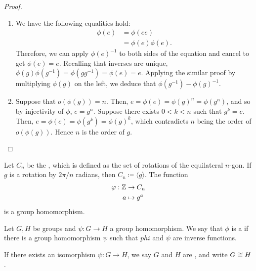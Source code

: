\begin{proof}
  \begin{enumerate}
  \item
    We have the following equalities hold:
    \begin{align*}
      \phi(e) &= \phi(ee) \\
              &= \phi(e) \phi(e).
    \end{align*}
    Therefore, we can apply \(\phi(e)^{-1}\) to both sides of the equation and cancel to get \(\phi(e) = e\).
    Recalling that inverses are unique, \(\phi(g)\phi(g^{-1}) = \phi(gg^{-1}) = \phi(e) = e\).
    Applying the similar proof by multiplying \(\phi(g)\) on the left, we deduce that \(\phi(g^{-1}) - \phi(g)^{-1}\).

  \item
    Suppose that \(o(\phi(g)) = n\).
    Then, \(e = \phi(e) = \phi(g)^{n} = \phi(g^{n})\), and so by injectivity of \(\phi\), \(e = g^{n}\).
    Suppose there exists \(0 < k < n\) such that \(g^{k} = e\). Then, \(e = \phi(e) = \phi(g^{k}) = \phi(g)^{k}\), which contradicts \(n\) being the order of \(o(\phi(g))\). Hence \(n\) is the order of \(g\).

  \end{enumerate}
\end{proof}

\begin{example}
  Let \(C_{n}\) be the , which is defined as the set of rotations of the equilateral \(n\)-gon.
  If \(g\) is a rotation by \(2 \pi /n \) radians, then \(C_{n} \coloneqq \langle g \rangle\).
  The function
  \begin{align*}
    \varphi : \mathbb{Z} &\to C_{n} \\
    a &\mapsto g^{a}
  \end{align*}
  is a group homomorphism.
\end{example}


\begin{definition}
  \label{def:group-theory:group-isomorphism}
  Let \(G, H\) be groups and \(\psi : G \to H\) a group homomorphism.
  We say that \(\phi\) is a  if there is a group homomorphism \(\psi\) such that \(phi\) and \(\psi\) are inverse functions.

  If there exists an isomorphism \(\psi : G \to H\), we say \(G\) and \(H\) are , and write \(G \cong H\).
\end{definition}

